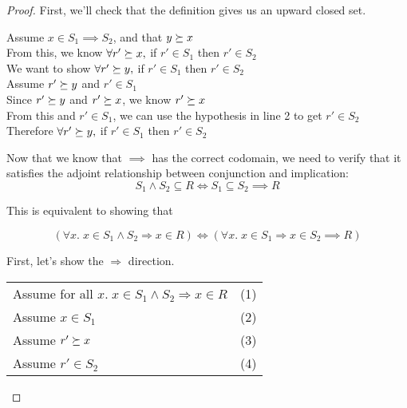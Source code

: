 \begin{proof}
First, we'll check that the definition gives us an upward closed set.

\vspace{0.5em}

\begin{tabbedproof}
\oo Assume $x \in S_1 \implies S_2$, and that $y \succeq x$ \\
\ooo From this, we know $\forall r' \succeq x, $ if $r' \in S_1$ then $r' \in S_2$ \\
\ooo We want to show $\forall r' \succeq y, $ if $r' \in S_1$ then $r' \in S_2$ \\
\ooo Assume $r' \succeq y$ and $r' \in S_1$ \\
\oooo Since $r' \succeq y$ and $r' \succeq x$, we know $r' \succeq x$ \\
\oooo From this  and $r' \in S_1$, we can use the hypothesis in line 2 to get $r' \in S_2$ \\
\ooo Therefore $\forall r' \succeq y, $ if $r' \in S_1$ then $r' \in S_2$ \\
\end{tabbedproof}

\noindent Now that we know that $\implies$ has the correct codomain, we need to
verify that it satisfies the adjoint relationship between conjunction and 
implication: 
\begin{displaymath}
S_1 \land S_2 \subseteq R \iff S_1 \subseteq S_2 \implies R
\end{displaymath}

\noindent This is equivalent to showing that 

\begin{displaymath}
(\forall x.\; x \in S_1 \land S_2 \Rightarrow x \in R) \iff
(\forall x.\; x \in S_1 \Rightarrow x \in S_2 \implies R)
\end{displaymath}

\noindent First, let's show the $\Rightarrow$ direction.
\\

\begin{tabular}{ll}
Assume for all $x.\; x \in S_1 \land S_2 \Rightarrow x \in R$ &
(1)
\\

Assume $x \in S_1$ &
(2)
\\

Assume $r' \succeq x$ &
(3)
\\

Assume $r' \in S_2$ & 
(4)
\\


\end{tabular}
\end{proof}
